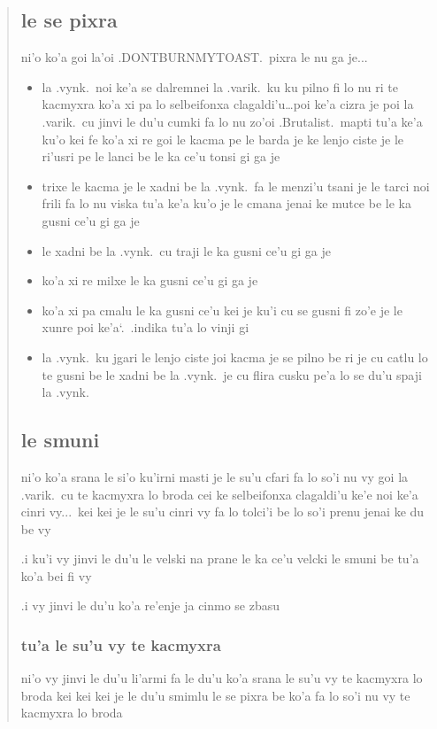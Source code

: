 \documentclass{report}
\newcommand\sds{\spacefactor\sfcode`.\ \space}
\begin{document}
\begin{quote}
	\subsection{le se pixra}
	ni'o ko'a goi la'oi .DONTBURNMYTOAST.\ pixra le nu ga je...

	\begin{itemize}
		\item la .vynk.\ noi ke'a se dalremnei la .varik.\ ku ku pilno fi lo nu ri te kacmyxra ko'a xi pa lo selbeifonxa clagaldi'u\ldots poi ke'a cizra je poi la .varik.\ cu jinvi le du'u cumki fa lo nu zo'oi .Brutalist.\ mapti tu'a ke'a ku'o kei fe ko'a xi re goi le kacma pe le barda je ke lenjo ciste je le ri'usri pe le lanci be le ka ce'u tonsi gi ga je
		\item trixe le kacma je le xadni be la .vynk.\ fa le menzi'u tsani je le tarci noi frili fa lo nu viska tu'a ke'a ku'o je le cmana jenai ke mutce be le ka gusni ce'u gi ga je
		\item le xadni be la .vynk.\ cu traji le ka gusni ce'u gi ga je
		\item ko'a xi re milxe le ka gusni ce'u gi ga je
		\item ko'a xi pa cmalu le ka gusni ce'u kei je ku'i cu se gusni fi zo'e je le xunre poi ke'a\sds .indika tu'a lo vinji gi
		\item la .vynk.\ ku jgari le lenjo ciste joi kacma je se pilno be ri je cu catlu lo te gusni be le xadni be la .vynk.\ je cu flira cusku pe'a lo se du'u spaji la .vynk.
	\end{itemize}

	\subsection{le smuni}
	ni'o ko'a srana le si'o ku'irni masti je le su'u cfari fa lo so'i nu vy goi la .varik.\ cu te kacmyxra lo broda cei ke selbeifonxa clagaldi'u ke'e noi ke'a cinri vy...\ kei kei je le su'u cinri vy fa lo tolci'i be lo so'i prenu jenai ke du be vy

	.i ku'i vy jinvi le du'u le velski na prane le ka ce'u velcki le smuni be tu'a ko'a bei fi vy

	.i vy jinvi le du'u ko'a re'enje ja cinmo se zbasu

	\subsubsection{tu'a le su'u vy te kacmyxra}
	ni'o vy jinvi le du'u li'armi fa le du'u ko'a srana le su'u vy te kacmyxra lo broda kei kei kei je le du'u smimlu le se pixra be ko'a fa lo so'i nu vy te kacmyxra lo broda


\end{quote}
\end{document}
